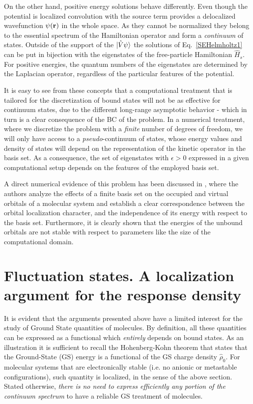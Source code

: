 \documentclass[reprint,aps,prb]{revtex4-1}
\renewcommand{\r}{{\bf r}}
\newcommand{\op}[1]{\hat {#1}}
\newcommand{\dmnot}{\op{\rho}_0}
\begin{document}
On the other hand, positive energy solutions behave differently.
Even though the potential is localized  convolution with the source term provides a delocalized wavefunction $\psi(\r)$ in the whole space.
As they cannot be normalized they belong to the essential spectrum of the Hamiltonian operator and form a \emph{continuum} of states.
Outside of the support of the $\ket{\op V \psi}$ the solutions of Eq.~\eqref{SEHelmholtz1} can be put in bijection with the eigenstates of the
free-particle Hamiltonian $\op H_s$. For positive energies, the quantum numbers of the eigenstates are determined by the Laplacian operator,
regardless of the particular features of the potential.

It is easy to see from these concepts that a computational treatment that is tailored for the discretization of bound states
will not be as effective for continuum states, due to the different long-range asymptotic behavior - which in turn is a clear consequence of the
BC of the problem. In a numerical treatment, where we discretize the problem with a \emph{finite}
number of degrees of freedom, we will only have access to a \emph{pseudo}-continuum of states,
whose energy values and density of states will depend on the representation of the kinetic operator
in the basis set. As a consequence, the set of eigenstates with $\epsilon > 0$ expressed in a given computational setup depends on the features of the employed basis set.

A direct numerical evidence of this problem has been discussed in \cite{boffi2016}, where the authors analyze the effects of a finite basis set on the
occupied and virtual orbitals of a molecular system and establish a clear correspondence between the orbital localization character,
and the independence of its energy with respect to the basis set.
Furthermore, it is clearly shown that the energies of the unbound orbitals are not stable with respect to parameters like the size of the computational domain.

\section{Fluctuation states. A localization argument for the response density}
\label{FluctuationState}
It is evident that the arguments presented above have a limited interest for the study
of Ground State quantities of molecules. By definition, all these quantities can be expressed as a
functional which \emph{entirely} depends on bound states. As an illustration it is sufficient to recall
the Hohenberg-Kohn theorem that states that the Ground-State (GS) energy is a functional of the GS
charge density $\dmnot$. For molecular systems that are electronically stable (i.e. no anionic or metastable configurations),
such quantity is localized, in the sense of the above section. Stated otherwise,
\emph{there is no need to express efficiently any portion of the continuum spectrum} to have a reliable GS treatment of molecules.
\end{document}

